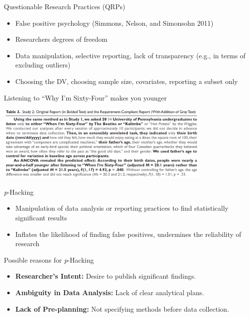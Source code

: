 \documentclass[
  ignorenonframetext,
  aspectratio=169,
]{beamer}
\providecommand{\tightlist}{%
  \setlength{\itemsep}{0pt}\setlength{\parskip}{0pt}}\usepackage{longtable,booktabs,array}
\begin{document}
\begin{frame}{Questionable Research Practices (QRPs)}
\label{questionable-research-practices-qrps}
\begin{itemize}[<+->]
\tightlist
\item
  False positive psychology (Simmons, Nelson, and Simonsohn 2011)
\item
  Researchers degrees of freedom
\item
  Data manipulation, selective reporting, lack of transparency (e.g., in
  terms of excluding outliers)
\item
  Choosing the DV, choosing sample size, covariates, reporting a subset
  only
\end{itemize}
\end{frame}

\begin{frame}{Listening to ``Why I'm Sixty-Four'' makes you younger}
\label{listening-to-why-im-sixty-four-makes-you-younger}
\begin{center}
\includegraphics[width=0.8\textwidth,height=\textheight]{figs/p-Hacking.png}
\end{center}
\end{frame}

\begin{frame}{\emph{p}-Hacking}
\label{p-hacking}
\begin{itemize}[<+->]
\tightlist
\item
  Manipulation of data analysis or reporting practices to find
  statistically significant results
\item
  Inflates the likelihood of finding false positives, undermines the
  reliability of research
\end{itemize}
\end{frame}

\begin{frame}{Possible reasons for \emph{p}-Hacking}
\label{possible-reasons-for-p-hacking}
\begin{itemize}[<+->]
\tightlist
\item
  \textbf{Researcher's Intent:} Desire to publish significant findings.
\item
  \textbf{Ambiguity in Data Analysis:} Lack of clear analytical plans.
\item
  \textbf{Lack of Pre-planning:} Not specifying methods before data
  collection.
\end{itemize}
\end{frame}
\end{document}
